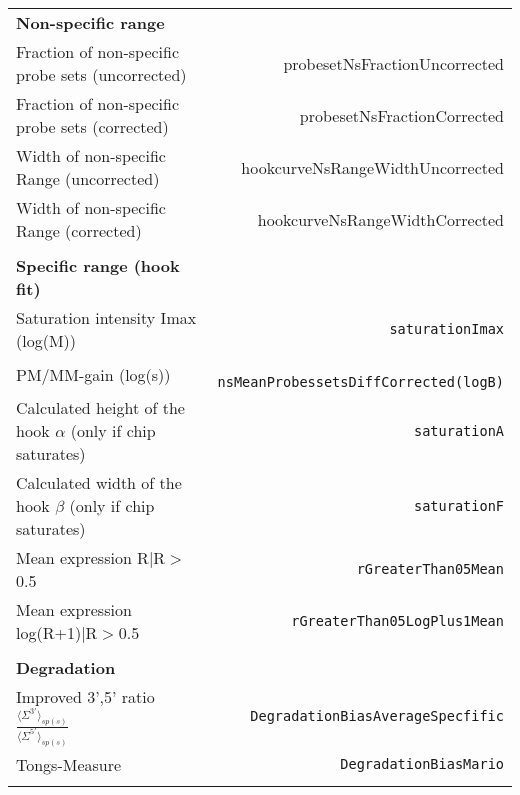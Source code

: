 \documentclass[a4paper, 10pt]{article}
\begin{document}
\begin{tabular}{lr}
	{\bf Non-specific range} \\
    Fraction of non-specific probe sets (uncorrected) & probesetNsFractionUncorrected \\
    Fraction of non-specific probe sets (corrected) & probesetNsFractionCorrected \\
	Width of non-specific Range (uncorrected) & hookcurveNsRangeWidthUncorrected \\
	Width of non-specific Range (corrected) & hookcurveNsRangeWidthCorrected \\ \\
	{\bf Specific range (hook fit)} \\
  Saturation intensity Imax (log(M))&\verb| saturationImax| \\
	PM/MM-gain (log(s))  &\verb| nsMeanProbessetsDiffCorrected(logB)| \\ %
	Calculated height of the hook $\alpha$ (only if chip saturates) &\verb| saturationA| \\
	Calculated width of the hook $\beta$ (only if chip saturates) &\verb| saturationF| \\ 
	Mean expression R$|$R$>$0.5 &\verb| rGreaterThan05Mean| \\ 
	Mean expression log(R+1)$|$R$>$0.5
  &\verb| rGreaterThan05LogPlus1Mean| \\ \\

	{\bf Degradation} \\
  Improved 3',5' ratio $\frac{\langle \Sigma^{3'} \rangle_{sp(s)}}{\langle \Sigma^{5'} \rangle_{sp(s)}}$ 
  &\verb| DegradationBiasAverageSpecfific| \\
  Tongs-Measure &\verb| DegradationBiasMario| \\ \\    
\end{tabular}\\
\end{document}
